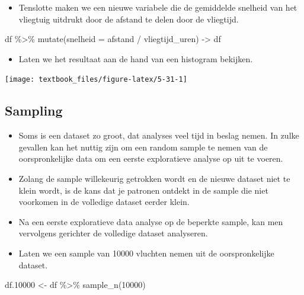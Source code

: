 \documentclass[]{tufte-book}
\newenvironment{Shaded}{}{}
\newcommand{\AttributeTok}[1]{\textcolor[rgb]{0.49,0.56,0.16}{#1}}
\newcommand{\DecValTok}[1]{\textcolor[rgb]{0.25,0.63,0.44}{#1}}
\newcommand{\FloatTok}[1]{\textcolor[rgb]{0.25,0.63,0.44}{#1}}
\newcommand{\FunctionTok}[1]{\textcolor[rgb]{0.02,0.16,0.49}{#1}}
\newcommand{\NormalTok}[1]{#1}
\newcommand{\OtherTok}[1]{\textcolor[rgb]{0.00,0.44,0.13}{#1}}
\newcommand{\SpecialCharTok}[1]{\textcolor[rgb]{0.25,0.44,0.63}{#1}}
\providecommand{\tightlist}{%
  \setlength{\itemsep}{0pt}\setlength{\parskip}{0pt}}
\begin{document}
\begin{itemize}
\tightlist
\item
  Tenslotte maken we een nieuwe variabele die de gemiddelde snelheid van het vliegtuig uitdrukt door de afstand te delen door de vliegtijd.
\end{itemize}

\begin{Shaded}
\begin{Highlighting}[]
\NormalTok{df }\SpecialCharTok{\%\textgreater{}\%}
  \FunctionTok{mutate}\NormalTok{(}\AttributeTok{snelheid =}\NormalTok{ afstand }\SpecialCharTok{/}\NormalTok{ vliegtijd\_uren) }\OtherTok{{-}\textgreater{}}\NormalTok{ df}
\end{Highlighting}
\end{Shaded}

\begin{itemize}
\tightlist
\item
  Laten we het resultaat aan de hand van een histogram bekijken.
\end{itemize}

\texttt{[image: textbook\_files/figure-latex/5-31-1]}

\hypertarget{sampling}{%
\subsection{Sampling}\label{sampling}}

\begin{itemize}
\tightlist
\item
  Soms is een dataset zo groot, dat analyses veel tijd in beslag nemen. In zulke gevallen kan het nuttig zijn om een random sample te nemen van de oorspronkelijke data om een eerste exploratieve analyse op uit te voeren.
\item
  Zolang de sample willekeurig getrokken wordt en de nieuwe dataset niet te klein wordt, is de kans dat je patronen ontdekt in de sample die niet voorkomen in de volledige dataset eerder klein.
\item
  Na een eerste exploratieve data analyse op de beperkte sample, kan men vervolgens gerichter de volledige dataset analyseren.
\item
  Laten we een sample van 10000 vluchten nemen uit de oorspronkelijke dataset.
\end{itemize}

\begin{Shaded}
\begin{Highlighting}[]
\NormalTok{df}\FloatTok{.10000} \OtherTok{\textless{}{-}}\NormalTok{ df }\SpecialCharTok{\%\textgreater{}\%} \FunctionTok{sample\_n}\NormalTok{(}\DecValTok{10000}\NormalTok{)}
\end{Highlighting}
\end{Shaded}
\end{document}
